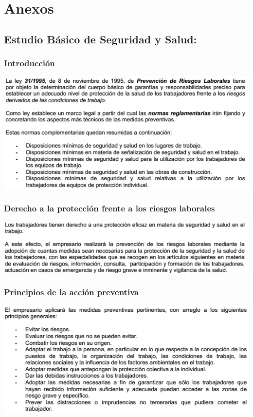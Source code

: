 \newpage \section{Anexos}

\subsection{Estudio Básico de Seguridad y Salud:}
\label{sec:EBSS}
\subsubsection{Introducción}
\includegraphics[width=15cm,keepaspectratio]{Memoria/EBSS/1.png}
\subsubsection{Derecho a la protección frente a los riesgos laborales}
\includegraphics[width=15cm,keepaspectratio]{Memoria/EBSS/2.png}
\subsubsection{Principios de la acción preventiva}
\includegraphics[width=15cm,keepaspectratio]{Memoria/EBSS/3.png}
